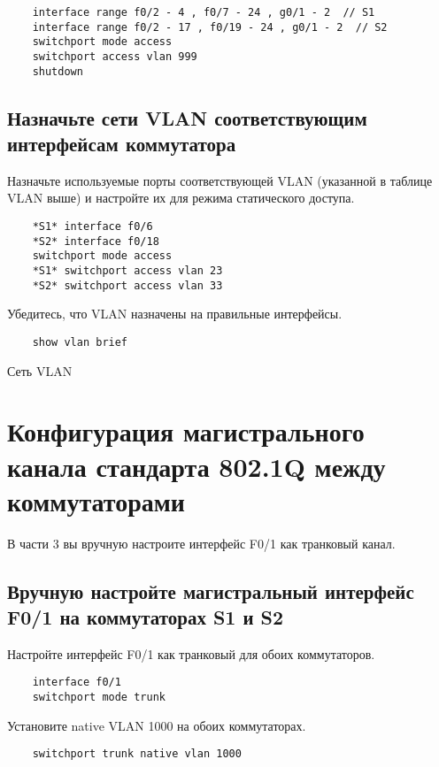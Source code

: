 \begin{verbatim}
	interface range f0/2 - 4 , f0/7 - 24 , g0/1 - 2  // S1
	interface range f0/2 - 17 , f0/19 - 24 , g0/1 - 2  // S2
	switchport mode access
	switchport access vlan 999
	shutdown
\end{verbatim}

\subsection{Назначьте сети VLAN соответствующим интерфейсам коммутатора}
Назначьте используемые порты соответствующей VLAN
(указанной в таблице VLAN выше)
и настройте их для режима статического доступа.

\begin{verbatim}
	*S1* interface f0/6
	*S2* interface f0/18
	switchport mode access
	*S1* switchport access vlan 23
	*S2* switchport access vlan 33
\end{verbatim}

Убедитесь, что VLAN назначены на правильные интерфейсы.

\begin{verbatim}
	show vlan brief
\end{verbatim}

\begin{image}
	\caption{Сеть VLAN}
	\label{fig:switch:vlan}
\end{image}


\section{Конфигурация магистрального канала стандарта 802.1Q
	между коммутаторами}
В части 3 вы вручную настроите интерфейс F0/1 как транковый канал.

\subsection{Вручную настройте магистральный интерфейс F0/1
	на коммутаторах S1 и S2}

Настройте интерфейс F0/1 как транковый для обоих коммутаторов.

\begin{verbatim}
	interface f0/1
	switchport mode trunk
\end{verbatim}

Установите native VLAN 1000 на обоих коммутаторах.

\begin{verbatim}
	switchport trunk native vlan 1000
\end{verbatim}

